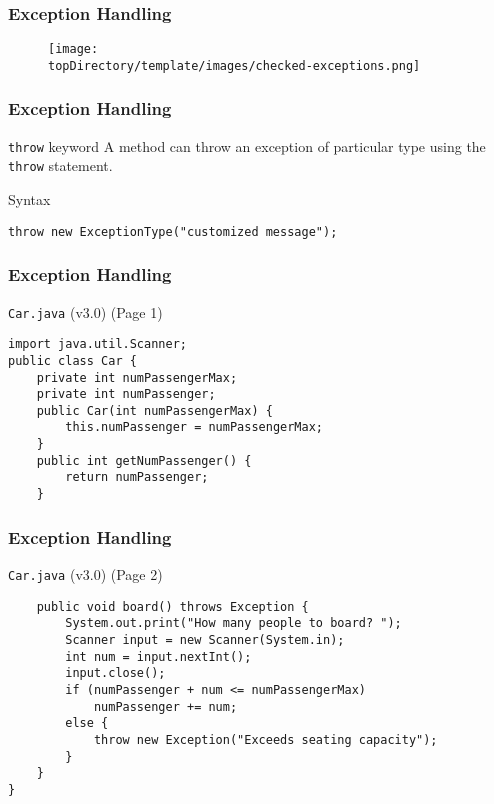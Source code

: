 \documentclass[10pt, compress]{beamer}
\begin{document}
\begin{frame}[fragile]
	\frametitle{Exception Handling}
	\begin{figure}
		\texttt{[image: \\topDirectory/template/images/checked-exceptions.png]}
	\end{figure}
\end{frame}

\begin{frame}[fragile]
	\frametitle{Exception Handling}
	\begin{block}{\texttt{throw} keyword}
		A method can throw an exception of particular type using the \texttt{throw} statement.
	\end{block}
	\begin{block}{Syntax}
		\begin{verbatim}
throw new ExceptionType("customized message");
		\end{verbatim}
	\end{block}
\end{frame}

\begin{frame}[fragile]
	\frametitle{Exception Handling}
	\begin{block}{\texttt{Car.java} (v3.0) (Page 1)}
		\begin{verbatim}
import java.util.Scanner;
public class Car {
	private int numPassengerMax;
	private int numPassenger;
	public Car(int numPassengerMax) {
		this.numPassenger = numPassengerMax;
	}
	public int getNumPassenger() {
		return numPassenger;
	}
		\end{verbatim}
	\end{block}
\end{frame}

\begin{frame}[fragile]
	\frametitle{Exception Handling}
	\begin{block}{\texttt{Car.java} (v3.0) (Page 2)}
		\begin{verbatim}
	public void board() throws Exception {
		System.out.print("How many people to board? ");
		Scanner input = new Scanner(System.in);
		int num = input.nextInt();
		input.close();
		if (numPassenger + num <= numPassengerMax)
			numPassenger += num;
		else {
			throw new Exception("Exceeds seating capacity");
		}
	}
}
		\end{verbatim}
	\end{block}
\end{frame}
\end{document}

